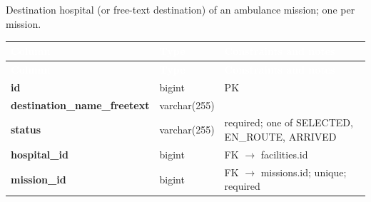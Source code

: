 \subsection*{}
Destination hospital (or free-text destination) of an ambulance mission; one per mission.\par\vspace{2pt}
{\tabfont\rowband
\begin{longtable}{@{}>{\raggedright\arraybackslash}p{}>{\raggedright\arraybackslash}p{}>{\raggedright\arraybackslash}p{}@{}}
\rowcolor{najdanavy}\textcolor{white}{\sffamily\bfseries\small Column} & \textcolor{white}{\sffamily\bfseries\small Type} & \textcolor{white}{\sffamily\bfseries\small Constraints and notes}\\
\endfirsthead
\rowcolor{najdanavy}\textcolor{white}{\sffamily\bfseries\small Column} & \textcolor{white}{\sffamily\bfseries\small Type} & \textcolor{white}{\sffamily\bfseries\small Constraints and notes}\\
\endhead
\bottomrule\endlastfoot
\textbf{id} & bigint & PK\\
\textbf{destination\_\allowbreak{}name\_\allowbreak{}freetext} & varchar(255) & \\
\textbf{status} & varchar(255) & required; one of SELECTED, EN\_\allowbreak{}ROUTE, ARRIVED\\
\textbf{hospital\_\allowbreak{}id} & bigint & FK $\rightarrow$ facilities.id\\
\textbf{mission\_\allowbreak{}id} & bigint & FK $\rightarrow$ missions.id; unique; required\\
\end{longtable}}


